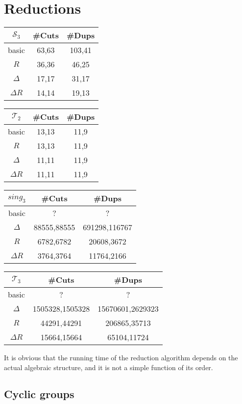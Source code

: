 \documentclass{amsart}
\newcommand{\cT}{{\mathcal T}}
\newcommand{\cS}{{\mathcal S}}
\theoremstyle{plain}
\theoremstyle{definition}
\begin{document}
\section{Reductions}


\begin{tabular}{c|cc}
$\cS_3$ & \#Cuts & \#Dups \\
\hline
basic  & 63,63 & 103,41\\
$R$ &36,36 & 46,25\\
$\Delta$ & 17,17 & 31,17 \\
$\Delta R$ & 14,14 & 19,13
\end{tabular}


\begin{tabular}{c|cc}
$\cT_2$ & \#Cuts & \#Dups \\
\hline
basic  & 13,13 & 11,9\\
$R$ &13,13 & 11,9\\
$\Delta$ & 11,11 & 11,9 \\
$\Delta R$ & 11,11 & 11,9
\end{tabular}


\begin{tabular}{c|cc}
$sing_3$ & \#Cuts & \#Dups \\
\hline
basic  & ? & ?\\
$\Delta$ & 88555,88555 & 691298,116767 \\
$R$ &6782,6782 & 20608,3672\\
$\Delta R$ & 3764,3764 & 11764,2166
\end{tabular}

\begin{tabular}{c|cc}
$\cT_3$ & \#Cuts & \#Dups \\
\hline
basic  & ? & ?\\
$\Delta$ & 1505328,1505328 & 15670601,2629323 \\
$R$ & 44291,44291 & 206865,35713\\
$\Delta R$ &15664,15664 & 65104,11724
\end{tabular}



It is obvious that the running time of the reduction algorithm depends on the actual algebraic structure, and it is not a simple function of its  order. 

\subsection{Cyclic groups}
\end{document}
